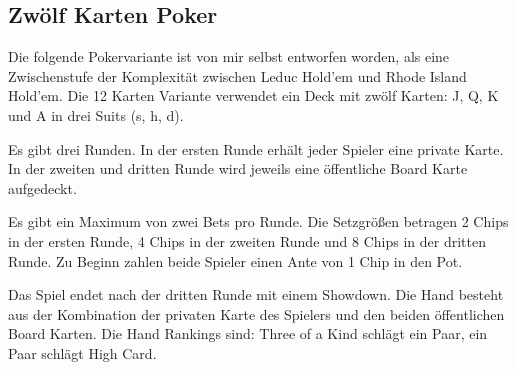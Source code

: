 \subsection{Zwölf Karten Poker}
Die folgende Pokervariante ist von mir selbst entworfen worden, als eine Zwischenstufe der Komplexität zwischen Leduc Hold'em und Rhode Island Hold'em.
Die 12 Karten Variante verwendet ein Deck mit zwölf Karten: J, Q, K und A in drei Suits (s, h, d).

Es gibt drei Runden.
In der ersten Runde erhält jeder Spieler eine private Karte.
In der zweiten und dritten Runde wird jeweils eine öffentliche Board Karte aufgedeckt.

Es gibt ein Maximum von zwei Bets pro Runde.
Die Setzgrößen betragen 2 Chips in der ersten Runde, 4 Chips in der zweiten Runde und 8 Chips in der dritten Runde.
Zu Beginn zahlen beide Spieler einen Ante von 1 Chip in den Pot.

Das Spiel endet nach der dritten Runde mit einem Showdown.
Die Hand besteht aus der Kombination der privaten Karte des Spielers und den beiden öffentlichen Board Karten.
Die Hand Rankings sind: Three of a Kind schlägt ein Paar, ein Paar schlägt High Card.



